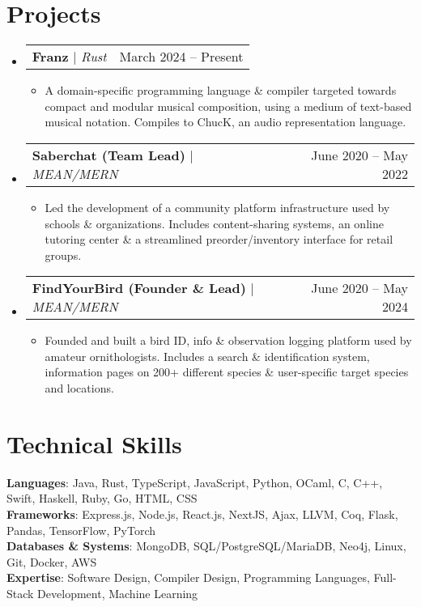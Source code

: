 \documentclass[letterpaper,11pt]{article}
\makeatletter
\newcommand{\resumeItem}[1]{
  \item\small{
    {#1 \vspace{-2pt}}
  }
}
\newcommand{\resumeProjectHeading}[2]{
    \item
    \begin{tabular*}{0.97\textwidth}{l@{\extracolsep{\fill}}r}
      \small#1 & #2 \\
    \end{tabular*}\vspace{-7pt}
}
\newcommand{\resumeSubHeadingListStart}{\begin{itemize}[leftmargin=0.15in, label={}]}
\newcommand{\resumeSubHeadingListEnd}{\end{itemize}}
\newcommand{\resumeItemListStart}{\begin{itemize}}
\newcommand{\resumeItemListEnd}{\end{itemize}\vspace{-5pt}}
\makeatother
\begin{document}
\section{Projects}
    \resumeSubHeadingListStart
      \resumeProjectHeading
          {\textbf{Franz} $|$ \emph{Rust}}{March 2024 -- Present}
          \resumeItemListStart
            \resumeItem{A domain-specific programming language \& compiler targeted towards compact and modular musical composition, using a medium of text-based musical notation. Compiles to ChucK, an audio representation language.\\[-2pt]}
          \resumeItemListEnd
      \resumeProjectHeading
          {\textbf{Saberchat (Team Lead)} $|$ \emph{MEAN/MERN}}{June 2020 -- May 2022}
          \resumeItemListStart
            \resumeItem{Led the development of a community platform infrastructure used by schools \& organizations. Includes content-sharing systems, an online tutoring center \& a streamlined preorder/inventory interface for retail groups.\\[-1pt]}
          \resumeItemListEnd
      \resumeProjectHeading
          {\textbf{FindYourBird (Founder \& Lead)} $|$ \emph{MEAN/MERN}}{June 2020 -- May 2024}
          \resumeItemListStart
            \resumeItem{Founded and built a bird ID, info \& observation logging platform used by amateur ornithologists. Includes a search \& identification system, information pages on 200+ different species \& user-specific target species and locations.\\[-2pt]}
          \resumeItemListEnd
    \resumeSubHeadingListEnd
%
\section{Technical Skills}
 \begin{itemize}[leftmargin=0.15in, label={}]
    \small{\item{
     \textbf{Languages}{: Java, Rust, TypeScript, JavaScript, Python, OCaml, C, C++, Swift, Haskell, Ruby, Go, HTML, CSS} \\
     \textbf{Frameworks}{: Express.js, Node.js, React.js, NextJS, Ajax, LLVM, Coq, Flask, Pandas, TensorFlow, PyTorch} \\
     \textbf{Databases \& Systems}{: MongoDB, SQL/PostgreSQL/MariaDB, Neo4j, Linux, Git, Docker, AWS}\\
     \textbf{Expertise}{: Software Design, Compiler Design, Programming Languages, Full-Stack Development, Machine Learning} \\
    }}
 \end{itemize}


\end{document}
